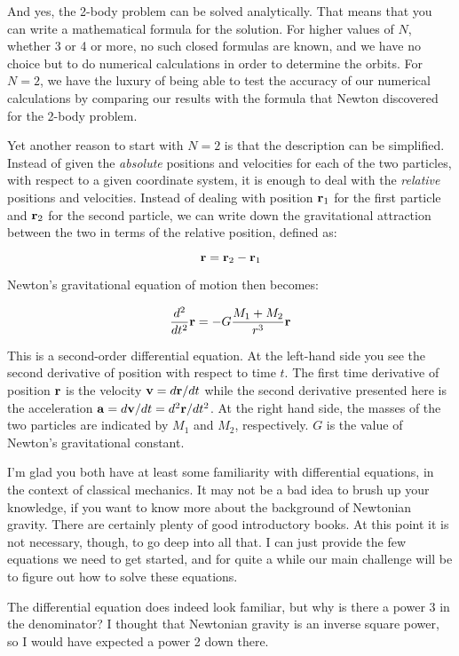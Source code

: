 \documentclass{book}
\def\bob{\item[Bob:]}
\def\br{{\bf r}}
\def\bv{{\bf v}}
\def\ba{{\bf a}}
\begin{document}
And yes, the 2-body problem can be solved analytically.  That means
that you can write a mathematical formula for the solution.  For
higher values of $N$, whether 3 or 4 or more, no such closed formulas
are known, and we have no choice but to do numerical calculations in
order to determine the orbits.  For $N=2$, we have the luxury of being
able to test the accuracy of our numerical calculations by comparing
our results with the formula that Newton discovered for the 2-body
problem.

Yet another reason to start with $N=2$ is that the description can be
simplified.  Instead of given the {\it absolute} positions and
velocities for each of the two particles, with respect to a given
coordinate system, it is enough to deal with the {\it relative}
positions and velocities.  Instead of dealing with position $\br_1$
for the first particle and $\br_2$ for the second particle, we can
write down the gravitational attraction between the two in terms of
the relative position, defined as:

$$
\br = \br_2 - \br_1
$$

Newton's gravitational equation of motion then becomes:

$$
\frac{d^2}{dt^2}\br = - G \frac{M_1 + M_2}{r^3}\br
$$

This is a second-order differential equation.  At the left-hand side
you see the second derivative of position with respect to time $t$.  The
first time derivative of position $\br$ is the velocity $\bv = d\br /dt$
while the second derivative presented here is the acceleration
$\ba = d\bv /dt = d^2\br /dt^2 $.  At the right hand side, the masses
of the two particles are indicated by $M_1$ and $M_2$, respectively.
$G$ is the value of Newton's gravitational constant.

I'm glad you both have at least some familiarity with differential
equations, in the context of classical mechanics.  It may not be a bad
idea to brush up your knowledge, if you want to know more about the
background of Newtonian gravity.  There are certainly plenty of good
introductory books.  At this point it is not necessary, though, to go
deep into all that.  I can just provide the few equations we need to
get started, and for quite a while our main challenge will be to
figure out how to solve these equations.

\bob
The differential equation does indeed look familiar, but why is there
a power 3 in the denominator?  I thought that Newtonian gravity is an
inverse square power, so I would have expected a power 2 down there.
\end{document}
